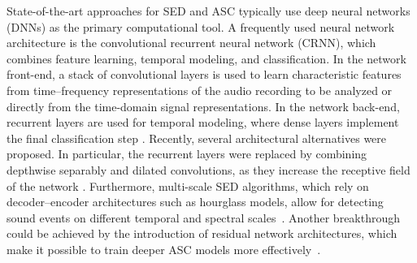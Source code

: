 \documentclass[11pt,a4paper]{article}
\theoremstyle{plain} \newtheorem{define}{Definition}[section]
\begin{document}
{State-of-the-art approaches for SED and ASC typically use deep neural networks (DNNs) as the primary computational tool. A frequently used neural network architecture is the convolutional recurrent neural network (CRNN), which combines feature learning, temporal modeling, and classification. In the network front-end, a stack of convolutional layers is used to learn characteristic features from time--frequency representations of the audio recording to be analyzed or directly from the time-domain signal representations. In the network back-end, recurrent layers are used for temporal modeling, where dense layers implement the final classification step \cite{Adavanne:2017:AEDWeaklyLabels:DCASE}.
%
Recently, several architectural alternatives were proposed. In particular, the recurrent layers were replaced by combining depthwise separably and dilated convolutions, as they increase the receptive field of the network \cite{DrossosMGLV20_SED_DS_DC_ARXIV}.  Furthermore,  multi-scale SED algorithms, which rely on decoder--encoder architectures such as hourglass models, allow for detecting sound events on different temporal and spectral scales~\cite{Ding:2020:AdaMD:IEEE_TASLP}. Another breakthrough could be achieved by the introduction of residual network architectures, which make it possible to train deeper ASC models more effectively~\cite{Koutini:2019:ResNet:EUSIPCO}.

}
\end{document}
